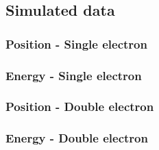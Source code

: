 \subsection{Simulated data}
\subsubsection{Position - Single electron}

\subsubsection{Energy - Single electron}

\subsubsection{Position - Double electron}

\subsubsection{Energy - Double electron}

